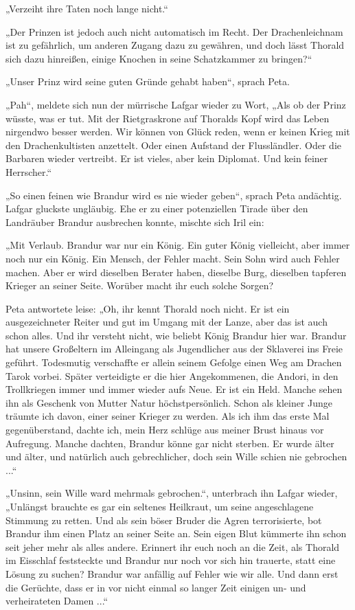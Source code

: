 „Verzeiht ihre Taten noch lange nicht.“

„Der Prinzen ist jedoch auch nicht automatisch im Recht. Der Drachenleichnam ist zu gefährlich, um anderen Zugang dazu zu gewähren, und doch lässt Thorald sich dazu hinreißen, einige Knochen in seine Schatzkammer zu bringen?“

„Unser Prinz wird seine guten Gründe gehabt haben“, sprach Peta.

„Pah“, meldete sich nun der mürrische Lafgar wieder zu Wort, „Als ob der Prinz wüsste, was er tut. Mit der Rietgraskrone auf Thoralds Kopf wird das Leben nirgendwo besser werden. Wir können von Glück reden, wenn er keinen Krieg mit den Drachenkultisten anzettelt. Oder einen Aufstand der Flussländler. Oder die Barbaren wieder vertreibt. Er ist vieles, aber kein Diplomat. Und kein feiner Herrscher.“

„So einen feinen wie Brandur wird es nie wieder geben“, sprach Peta andächtig. Lafgar gluckste ungläubig. Ehe er zu einer potenziellen Tirade über den Landräuber Brandur ausbrechen konnte, mischte sich Iril ein:

„Mit Verlaub. Brandur war nur ein König. Ein guter König vielleicht, aber immer noch nur ein König. Ein Mensch, der Fehler macht. Sein Sohn wird auch Fehler machen. Aber er wird dieselben Berater haben, dieselbe Burg, dieselben tapferen Krieger an seiner Seite. Worüber macht ihr euch solche Sorgen?

Peta antwortete leise: „Oh, ihr kennt Thorald noch nicht. Er ist ein ausgezeichneter Reiter und gut im Umgang mit der Lanze, aber das ist auch schon alles. Und ihr versteht nicht, wie beliebt König Brandur hier war. Brandur hat unsere Großeltern im Alleingang als Jugendlicher aus der Sklaverei ins Freie geführt. Todesmutig verschaffte er allein seinem Gefolge einen Weg am Drachen Tarok vorbei. Später verteidigte er die hier Angekommenen, die Andori, in den Trollkriegen immer und immer wieder aufs Neue. Er ist ein Held. Manche sehen ihn als Geschenk von Mutter Natur höchstpersönlich. Schon als kleiner Junge träumte ich davon, einer seiner Krieger zu werden. Als ich ihm das erste Mal gegenüberstand, dachte ich, mein Herz schlüge aus meiner Brust hinaus vor Aufregung. Manche dachten, Brandur könne gar nicht sterben. Er wurde älter und älter, und natürlich auch gebrechlicher, doch sein Wille schien nie gebrochen ...“

„Unsinn, sein Wille ward mehrmals gebrochen.“, unterbrach ihn Lafgar wieder, „Unlängst brauchte es gar ein seltenes Heilkraut, um seine angeschlagene Stimmung zu retten. Und als sein böser Bruder die Agren terrorisierte, bot Brandur ihm einen Platz an seiner Seite an. Sein eigen Blut kümmerte ihn schon seit jeher mehr als alles andere. Erinnert ihr euch noch an die Zeit, als Thorald im Eisschlaf feststeckte und Brandur nur noch vor sich hin trauerte, statt eine Lösung zu suchen? Brandur war anfällig auf Fehler wie wir alle. Und dann erst die Gerüchte, dass er in vor nicht einmal so langer Zeit einigen un- und verheirateten Damen ...“

